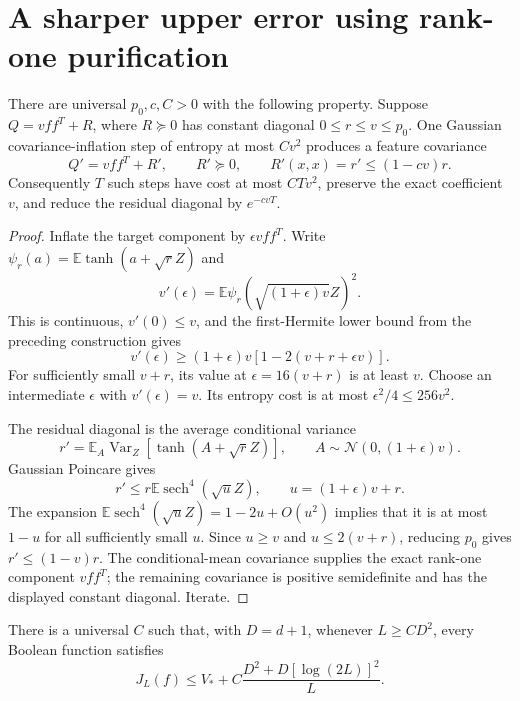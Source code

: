 \section{A sharper upper error using rank-one purification}
\label{sec:critical-sharp-flattening}

\begin{lemma}
\label{lem:exact-target-purification}
There are universal $p_0,c,C>0$ with the following property.
Suppose $Q=vff^T+R$, where $R\succeq0$ has constant diagonal
$0\le r\le v\le p_0$. One Gaussian covariance-inflation step of
entropy at most $Cv^2$ produces a feature covariance
\[
 Q'=vff^T+R',\qquad R'\succeq0,
 \qquad R'(x,x)=r'\le(1-cv)r.
\]
Consequently $T$ such steps have cost at most $CTv^2$, preserve
the exact coefficient $v$, and reduce the residual diagonal by
$e^{-cvT}$.
\end{lemma}

\begin{proof}
Inflate the target component by $\epsilon vff^T$. Write
$\psi_r(a)=\mathbb E\tanh(a+\sqrt rZ)$ and
\[
 v'(\epsilon)=
 \mathbb E\psi_r(\sqrt{(1+\epsilon)v}Z)^2.
\]
This is continuous, $v'(0)\le v$, and the first-Hermite lower bound
from the preceding construction gives
\[
 v'(\epsilon)\ge(1+\epsilon)v
                   [1-2(v+r+\epsilon v)].
\]
For sufficiently small $v+r$, its value at $\epsilon=16(v+r)$
is at least $v$. Choose an intermediate $\epsilon$ with
$v'(\epsilon)=v$. Its entropy cost is at most
$\epsilon^2/4\le256v^2$.

The residual diagonal is the average conditional variance
\[
 r'=\mathbb E_A\operatorname{Var}_{Z}
               [\tanh(A+\sqrt rZ)],
 \qquad A\sim\mathcal N(0,(1+\epsilon)v).
\]
Gaussian Poincare gives
\[
 r'\le r\mathbb E\operatorname{sech}^4(\sqrt uZ),
 \qquad u=(1+\epsilon)v+r.
\]
The expansion $\mathbb E\operatorname{sech}^4(\sqrt uZ)
=1-2u+O(u^2)$ implies that it is at most $1-u$ for all sufficiently
small $u$. Since $u\ge v$ and $u\le2(v+r)$, reducing $p_0$
gives $r'\le(1-v)r$. The conditional-mean covariance supplies the
exact rank-one component $vff^T$; the remaining covariance is positive
semidefinite and has the displayed constant diagonal. Iterate.
\end{proof}

\begin{theorem}
\label{thm:critical-sharp-upper}
There is a universal $C$ such that, with $D=d+1$, whenever
$L\ge CD^2$, every Boolean function satisfies
\[
 J_L(f)\le V_*+
 C\frac{D^2+D[\log(2L)]^2}{L}.
\]
\end{theorem}


